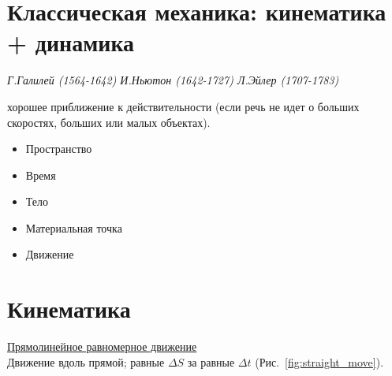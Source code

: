 \section{Классическая механика: кинематика + динамика}
\sf\Large
{\sl Г.Галилей (1564-1642)      И.Ньютон (1642-1727)       Л.Эйлер (1707-1783)}

хорошее приближение к действительности (если речь не идет о больших скоростях, больших или малых объектах).

\begin{itemize}
\item Пространство
\item Время
\item Тело
\item Материальная точка
\item Движение
\end{itemize}

\section{Кинематика}

\underline{Прямолинейное равномерное движение}\\

Движение вдоль прямой; равные $\Delta S$ за равные $\Delta t$ (Рис.~\ref{fig:straight_move}).

